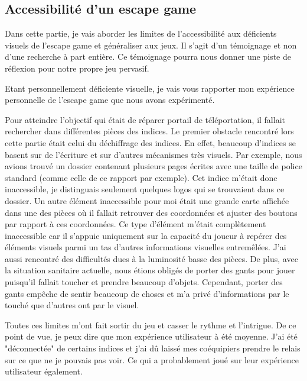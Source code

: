 \documentclass[11pt]{article}
\begin{document}
	\subsection{Accessibilité d'un escape game}
		Dans cette partie, je vais aborder les limites de l'accessibilité aux déficients visuels de l'escape game et généraliser aux jeux.
		Il s'agit d'un témoignage et non d'une recherche à part entière.
		Ce témoignage pourra nous donner une piste de réflexion pour notre propre jeu pervasif.\par
		Etant personnellement déficiente visuelle, je vais vous rapporter mon expérience personnelle de l'escape game que nous avons expérimenté.\par
		Pour atteindre l'objectif qui était de réparer portail de téléportation, il fallait rechercher dans différentes pièces des indices.
		Le premier obstacle rencontré lors cette partie était celui du déchiffrage des indices.
		En effet, beaucoup d'indices se basent sur de l'écriture et sur d'autres mécanismes très visuels.
		Par exemple, nous avions trouvé un dossier contenant plusieurs pages écrites avec une taille de police standard (comme celle de ce rapport par exemple).
		Cet indice m'était donc inaccessible, je distinguais seulement quelques logos qui se trouvaient dans ce dossier.
		Un autre élément inaccessible pour moi était une grande carte affichée dans une des pièces où il fallait retrouver des coordonnées et ajuster des boutons par rapport à ces coordonnées.
		Ce type d'élément m'était complètement inaccessible car il s'appuie uniquement sur la capacité du joueur à repérer des éléments visuels parmi un tas d'autres informations visuelles entremêlées.
		J'ai aussi rencontré des difficultés dues à la luminosité basse des pièces.
		De plus, avec la situation sanitaire actuelle, nous étions obligés de porter des gants pour jouer puisqu'il fallait toucher et prendre beaucoup d'objets.
		Cependant, porter des gants empêche de sentir beaucoup de choses et m'a privé d'informations par le touché que d'autres ont par le visuel.\par
		Toutes ces limites m'ont fait sortir du jeu et casser le rythme et l'intrigue.
		De ce point de vue, je peux dire que mon expérience utilisateur à été moyenne.
		J'ai été "déconnectée" de certains indices et j'ai dû laissé mes coéquipiers prendre le relais sur ce que ne je pouvais pas voir.
		Ce qui a probablement joué sur leur expérience utilisateur également.
\end{document}
